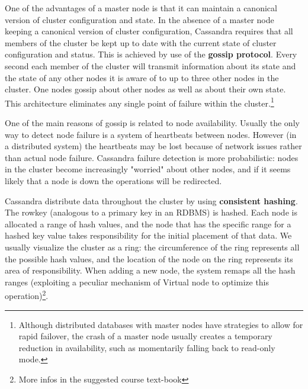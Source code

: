 \documentclass[a4page, 11pt]{article}
\begin{document}
One of the advantages of a master node is that it can maintain a canonical version of cluster
configuration and state. In the absence of a master node keeping a canonical version of cluster configuration, Cassandra requires that all members of the cluster be kept up to date with the current state of cluster configuration and status. This is achieved by use of the \textbf{gossip protocol}. Every second each member of the cluster will transmit information about its state and the state of any other nodes it is aware of to up to three other nodes in the cluster. One nodes gossip about other nodes as well as about their own state.
This architecture eliminates any single point of failure within the cluster.\footnote{Although distributed databases with master nodes have strategies to allow for rapid failover, the crash of a master node usually creates a temporary reduction in availability, such as momentarily falling back to read-only mode.}

One of the main reasons of gossip is related to node availability. Usually the only way to detect node failure is a system of heartbeats between nodes. However (in a distributed system) the heartbeats may be lost because of network issues rather than actual node failure. Cassandra failure detection is more probabilistic: nodes in the cluster become increasingly "worried" about other nodes, and if it seems likely that a node is down the operations will be redirected.

Cassandra distribute data throughout the cluster by using \textbf{consistent hashing}. The rowkey (analogous to a primary key in an RDBMS) is hashed. Each node is allocated a range of hash values, and the node that has the specific range for a hashed key value takes responsibility for the initial placement of that data.
We usually visualize the cluster as a ring: the circumference of the ring represents all the possible hash values, and the location of the node on the ring represents its area of responsibility. 
When adding a new node, the system remaps all
the hash ranges (exploiting a peculiar mechanism of Virtual node to optimize this operation)\footnote{More infos in the suggested course text-book}.

\end{document}
